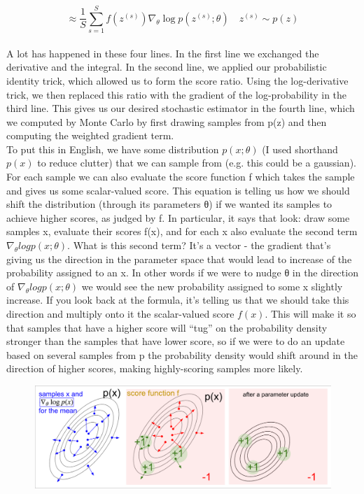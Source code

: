 \documentclass[12pt,a4paper]{article}
\begin{document}
$$\approx \frac{1}{S} \sum_{s=1}^{S}f(z^{(s)})\nabla_\theta \log p(z^{(s)};\theta) \quad z^{(s)}\sim p(z)$$\\[6pt]
A lot has happened in these four lines. In the first line we exchanged the derivative and the integral. In the second line, we applied our probabilistic identity trick, which allowed us to form the score ratio. Using the log-derivative trick, we then replaced this ratio with the gradient of the log-probability in the third line. This gives us our desired stochastic estimator in the fourth line, which we computed by Monte Carlo by first drawing samples from p(z) and then computing the weighted gradient term.\\

To put this in English, we have some distribution $p(x;\theta)$ (I used shorthand $p(x)$ to reduce clutter) that we can sample from (e.g. this could be a gaussian). For each sample we can also evaluate the score function f which takes the sample and gives us some scalar-valued score. This equation is telling us how we should shift the distribution (through its parameters θ) if we wanted its samples to achieve higher scores, as judged by f. In particular, it says that look: draw some samples x, evaluate their scores f(x), and for each x also evaluate the second term $\nabla_\theta logp(x;θ)$. What is this second term? It’s a vector - the gradient that’s giving us the direction in the parameter space that would lead to increase of the probability assigned to an x. In other words if we were to nudge θ in the direction of $\nabla_\theta logp(x;θ)$ we would see the new probability assigned to some x slightly increase. If you look back at the formula, it’s telling us that we should take this direction and multiply onto it the scalar-valued score $f(x)$. This will make it so that samples that have a higher score will “tug” on the probability density stronger than the samples that have lower score, so if we were to do an update based on several samples from p the probability density would shift around in the direction of higher scores, making highly-scoring samples more likely.
\begin{figure}[hbt!]
\begin{center}
\includegraphics[scale=0.4]{figure}
\end{center}
\end{figure}
\end{document}
